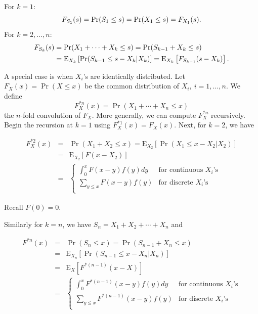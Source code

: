 \documentclass[]{book}
\theoremstyle{definition}
\theoremstyle{definition}
\theoremstyle{definition}
\theoremstyle{remark}
\begin{document}
For \(k=1\):
\[F_{S_1}(s) = {\rm Pr}(S_1\leq s) = {\rm Pr}(X_1\leq s) = F_{X_1}(s).\]
For \(k=2,\ldots,n\): \[\begin{aligned}
    F_{S_k}(s)&={\Pr}(X_1+\cdots+X_k\leq s) ={\Pr}(S_{k-1}+X_k\leq s) \\
    &={\rm E}_{X_k}\left[{\rm Pr}(S_{k-1}\leq s-X_k|X_k)\right]= {\rm E}_{X_k}\left[F_{S_{k-1}}(s-X_k)\right].
   \end{aligned}\]

A special case is when \(X_i\)'s are identically distributed. Let
\(F_X(x)={\Pr}(X\leq x)\) be the common distribution of
\(X_i, ~i=1,\ldots,n\). We define
\[F^{*n}_X(x)={\Pr}(X_1+\cdots+X_n\leq x)\] the \(n\)-fold convolution
of \(F_X\). More generally, we can compute \(F_X^{\ast n}\) recursively.
Begin the recursion at \(k=1\) using
\(F_X^{\ast 1} \left(x \right) =F_X(x)\). Next, for \(k=2\), we have

\begin{eqnarray*}
F_X^{\ast 2} \left(x \right) &=& \Pr(X_1 + X_2 \le x) = \mathrm{E}_{X_2} \left[ \Pr(X_1 \le x - X_2|X_2) \right] \\
&=& \mathrm{E}_{X_2} \left[ F(x - X_2) \right] \\
&=&\left\{\begin{array}{ll}
\int_{0}^{x} F(x-y) f(y) dy & \text{for continuous } X_i \text{'s} \\
\sum_{y \le x} F(x-y) f(y) & \text{for discrete } X_i \text{'s} \\
\end{array}\right.
\end{eqnarray*}

Recall \(F(0) = 0\).

Similarly for \(k=n\), we have \(S_n = X_1 + X_2 + \cdots + X_n\) and

\begin{eqnarray*}
F^{\ast n}\left(x\right) &=& \Pr(S_n \le x) = \Pr(S_{n-1} + X_n \le x)\\
&=&\mathrm{E}_{X_n} \left[ \Pr(S_{n-1} \le x - X_n|X_n) \right] \\
&=&\mathrm{E}_X \left[ F^{\ast(n-1)}(x - X) \right] \\
&=& 
\left\{\begin{array}{ll}
\int_{0}^{x} F^{\ast(n-1)}(x-y)f(y)dy & \text{for continuous } X_i \text{'s} \\
\sum_{y \le x} F^{\ast(n-1)}(x-y)f(y) & \text{for discrete } X_i \text{'s} \\
\end{array}\right.
\end{eqnarray*}
\end{document}
